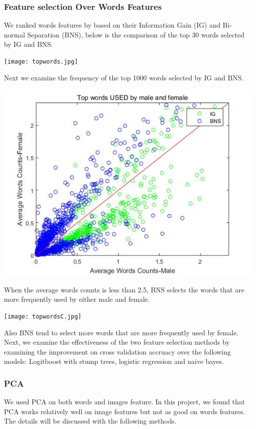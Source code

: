 \subsubsection{Feature selection Over Words Features}
We ranked words features by based on their Information Gain (IG) and Bi-normal Separation (BNS), below is the comparison of the top 30 words selected by IG and BNS.   
\begin{center}
\texttt{[image: topwords.jpg]}
\end{center}
Next we examine the frequency of the top 1000 words selected by IG and BNS.
\begin{center}
\includegraphics[scale=0.6]{topwordsB.jpg}
\end{center}
When the average words counts is less than 2.5, BNS selects the words that are more frequently used by either male and female.\\
\begin{center}
\texttt{[image: topwordsC.jpg]}
\end{center}
Also BNS tend to select more words that are more frequently used by female.\\
Next, we examine the effectiveness of the two feature selection methods by examining the improvement on cross validation accruacy over the following models: Logitboost with stump trees, logistic regression and naive bayes.\
\subsubsection{PCA}
We used PCA on both words and images feature. In this project, we found that PCA works relatively well on image features but not as good on words features. The details will be discussed with the following methods.
